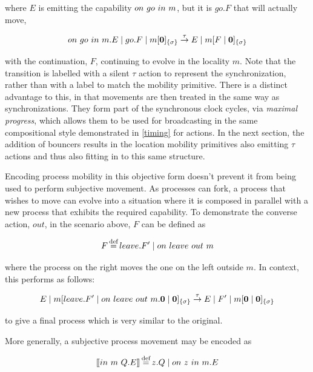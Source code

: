 \noindent where $E$ is emitting the capability $on\ go\ in\ m$, but it
is $go.F$ that will actually move,

\begin{equation}
on\ go\ in\ m.E \;|\; go.F \;|\; {m}[ \textbf{0} ]_{\{\sigma\}} \stackrel{\tau}{\rightarrow}
E \;|\; {m}[ F \;|\; \textbf{0} ]_{\{\sigma\}}
\end{equation}

\noindent with the continuation, $F$, continuing to evolve in the
locality $m$.  Note that the transition is labelled with a silent $\tau$
action to represent the synchronization, rather than with a label to
match the mobility primitive.  There is a distinct advantage to this, in
that movements are then treated in the same way as synchronizations.
They form part of the synchronous clock cycles, via \emph{maximal
progress}, which allows them to be used for broadcasting in the same
compositional style demonstrated in \ref{timing} for actions.  In the
next section, the addition of bouncers results in the location mobility
primitives also emitting $\tau$ actions and thus also fitting in to this
same structure. 

Encoding process mobility in this objective form doesn't prevent it from
being used to perform subjective movement.  As processes can fork, a
process that wishes to move can evolve into a situation where it is
composed in parallel with a new process that exhibits the required
capability.  To demonstrate the converse action, $out$, in the scenario
above, $F$ can be defined as

\begin{equation}
F \operatorname{\stackrel{\textrm{def}}{=}} leave.F^\prime \;|\; on\ leave\ out\ m
\end{equation}

\noindent where the process on the right moves the one on the left
outside $m$.  In context, this performs as follows:

\begin{equation}
E \;|\; {m}[ leave.F^\prime \;|\; on\ leave\ out\ m.\textbf{0} \;|\;
 \textbf{0} ]_{\{\sigma\}} 
\stackrel{\tau}{\rightarrow}
E \;|\; F^\prime \;|\; {m}[ \textbf{0} \;|\; \textbf{0} ]_{\{\sigma\}}
\end{equation}

\noindent to give a final process which is very similar to the original.

More generally, a subjective process movement may be encoded as

\begin{equation}
[\hspace{-0.3ex}[ in\ m\ Q.E ]\hspace{-0.3ex}] \operatorname{\stackrel{\textrm{def}}{=}} z.Q \;|\; on\ z\ in\ m.E
\end{equation}

